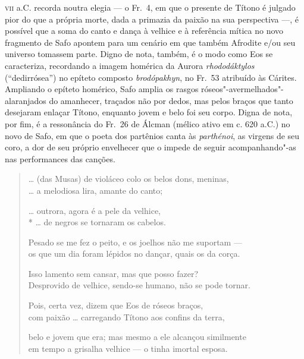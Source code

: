 \textsc{vii} a.C. recorda noutra elegia --- o Fr.~4, em que o presente de Títono é
julgado pior do que a própria morte, dada a primazia da paixão na sua perspectiva
---, é possível que a soma do canto e dança à
velhice e à referência mítica no novo fragmento de Safo apontem para um cenário
em que também Afrodite e/ou seu universo tomassem parte. Digno de nota, também,
é o modo como Eos se caracteriza, recordando a imagem homérica da Aurora
\textit{rhododáktylos} (``dedirrósea'') no
epíteto composto \textit{brodópakhyn}, no Fr.~53 atribuído às Cárites.
Ampliando o epíteto homérico, Safo amplia os rasgos
róseos"-avermelhados"-alaranjados do amanhecer, traçados não por dedos, mas pelos
braços que tanto desejaram enlaçar Títono, enquanto jovem e belo foi seu
corpo. Digna de nota, por fim, é a ressonância do Fr.~26 de Álcman (mélico ativo em c. 620 a.C.) no novo de Safo, em que o poeta dos partênios canta às \textit{parthénoi}, as virgens de seu coro, a dor de seu próprio envelhecer que o impede de seguir acompanhando"-as nas performances das canções.


\begin{verse}
\ldots{} (das Musas) de violáceo colo os belos dons, \qb{}meninas,\\
\ldots{} a melodiosa lira, amante do canto;

\ldots{} outrora, agora é a pele da velhice,\\*
\ldots{} de negros se tornaram os cabelos.


Pesado se me fez o peito, e os joelhos não me \qb{}suportam --- \\
os que um dia foram lépidos no dançar, quais \qb{}os da corça.

Isso lamento sem cansar, mas que posso \qb{}fazer?\\
Desprovido de velhice, sendo-se humano, \qb{}não se pode tornar.

Pois, certa vez, dizem que Eos de róseos \qb{}braços,\\
com paixão \ldots{} carregando Títono aos confins \qb{}da terra,

belo e jovem que era; mas mesmo a ele \qb{}alcançou similmente\\
em tempo a grisalha velhice --- o tinha \qb{}imortal esposa.
\end{verse}
